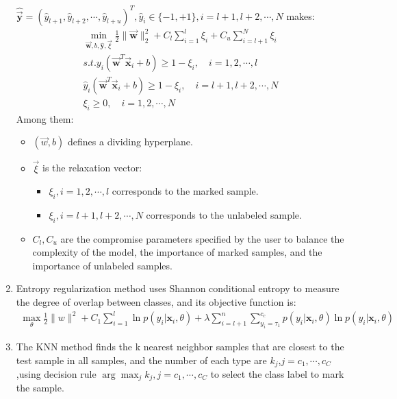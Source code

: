 \documentclass[11pt,en]{elegantpaper}
\begin{document}
\begin{enumerate}
$\hat{\overrightarrow{\mathbf{y}}}=\left(\hat{y}_{l+1}, \hat{y}_{l+2}, \cdots, \hat{y}_{l+u}\right)^{T}, \hat{y}_{i} \in\{-1,+1\}, i=l+1, l+2, \cdots, N$ makes:
\begin{equation}\begin{array}{c}
\min _{\overrightarrow{\mathbf{w}}, b, \hat{\mathbf{y}}, \vec{\xi}} \frac{1}{2}\|\overrightarrow{\mathbf{w}}\|_{2}^{2}+C_{l} \sum_{i=1}^{l} \xi_{i}+C_{u} \sum_{i=l+1}^{N} \xi_{i} \\
s . t . y_{i}\left(\overrightarrow{\mathbf{w}}^{T} \overrightarrow{\mathbf{x}}_{i}+b\right) \geq 1-\xi_{i}, \quad i=1,2, \cdots, l \\
\hat{y}_{i}\left(\overrightarrow{\mathbf{w}}^{T} \overrightarrow{\mathbf{x}}_{i}+b\right) \geq 1-\xi_{i}, \quad i=l+1, l+2, \cdots, N \\
\xi_{i} \geq 0, \quad i=1,2, \cdots, N
\end{array}\end{equation}
Among them:
\begin{itemize}
	\item $(\vec{w}, b)$ defines a dividing hyperplane.
	\item $\vec{\xi}$ is the relaxation vector:
	\begin{itemize}
		\item $\xi_{i}, i=1,2, \cdots, l$ corresponds to the marked sample.
		\item $\xi_{i}, i=l+1, l+2, \cdots, N$ corresponds to the unlabeled sample.
	\end{itemize}
	\item $C_{l},C_{u}$ are the compromise parameters specified by the user to balance the complexity of the model, the importance of marked samples, and the importance of unlabeled samples.
\end{itemize}
\item Entropy regularization method uses Shannon conditional entropy to measure the degree of overlap between classes, and its objective function is:
\begin{equation}\begin{array}{l}
\max _{\theta} \frac{1}{2}\|w\|^{2}+C_{1} \sum_{i=1}^{l} \ln p\left(y_{i} | \boldsymbol{x}_{i}, \theta\right)+
\lambda \sum_{i=l+1}^{n} \sum_{y_{i}=\tau_{1}}^{c_{c}} p\left(y_{i} | \boldsymbol{x}_{i}, \theta\right) \ln p\left(y_{i} | \boldsymbol{x}_{i}, \theta\right)
\end{array}\end{equation}
\item The KNN method finds the k nearest neighbor samples that are closest to the test sample in all samples, and the number of each type are $k_{j}$,$j=c_{1}, \cdots, c_{C}$,using decision rule $\arg \max _{j} k_{j}, j=c_{1}, \cdots, c_{C}$ to select the class label to mark the sample.
\end{enumerate}
\end{document}
